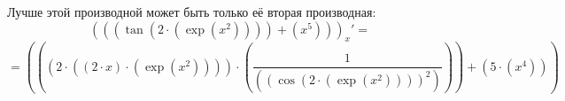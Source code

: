 \documentclass[12pt, a4paper]{article}
\begin{document}
\hspace{1cm}Лучше этой производной может быть только её вторая производная:
$$ ( (  {  (  \tan  (  {  {  2}  }  \cdot {  (  \exp  (  {  {x}  }  ^  {  {  2}  }  )  )  }  )  )  }  +  {  (  {  {x}  }  ^  {  {  5}  }  )  }  ) )_{x}' = $$
$$ =  (  {  (  {  (  {  {  2}  }  \cdot {  (  {  (  {  {  2}  }  \cdot {  {x}  }  )  }  \cdot {  (  \exp  (  {  {x}  }  ^  {  {  2}  }  )  )  }  )  }  )  }  \cdot {  (  \frac {  {  1}  }  {  (  {  (  \cos  (  {  {  2}  }  \cdot {  (  \exp  (  {  {x}  }  ^  {  {  2}  }  )  )  }  )  )  }  ^  {  {  2}  }  )  }  )  }  )  }  +  {  (  {  {  5}  }  \cdot {  (  {  {x}  }  ^  {  {  4}  }  )  }  )  }  )  $$
\end{document}
